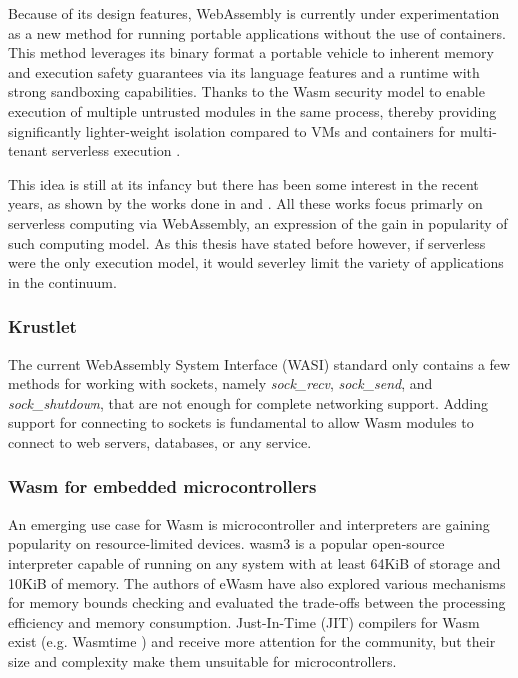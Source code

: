 Because of its design features, WebAssembly is currently under experimentation as a new method for running portable applications without the use of containers. This method leverages its binary format a portable vehicle to inherent memory and execution safety guarantees via its language features and a runtime with strong sandboxing capabilities. Thanks to the Wasm security model to enable execution of multiple untrusted modules in the same process, thereby providing significantly lighter-weight isolation compared to VMs and containers for multi-tenant serverless execution \cite{sledge}.

This idea is still at its infancy but there has been some interest in the recent years, as shown by the works done in \cite{execution-model-serverless-edge} and \cite{faasm}. All these works focus primarly on serverless computing via WebAssembly, an expression of the gain in popularity of such computing model. As this thesis have stated before however, if serverless were the only execution model, it would severley limit the variety of applications in the continuum.

\subsubsection{Krustlet}

The current WebAssembly System Interface (WASI) standard only contains a few methods for working with sockets, namely \emph{sock\_recv}, \emph{sock\_send}, and \emph{sock\_shutdown}, that are not enough for complete networking support. Adding support for connecting to sockets is fundamental to allow Wasm modules to connect to web servers, databases, or any service.

\subsubsection{Wasm for embedded microcontrollers}

An emerging use case for Wasm is microcontroller and interpreters are gaining popularity on resource-limited devices. wasm3 \cite{wasm3} is a popular open-source interpreter capable of running on any system with at least 64KiB of storage and 10KiB of memory. The authors of eWasm \cite{ewasm} have also explored various mechanisms for memory bounds checking and evaluated the trade-offs between the processing efficiency and memory consumption. Just-In-Time (JIT) compilers for Wasm exist (e.g. Wasmtime \cite{wasmtime}) and receive more attention for the community, but their size and complexity make them unsuitable for microcontrollers.

